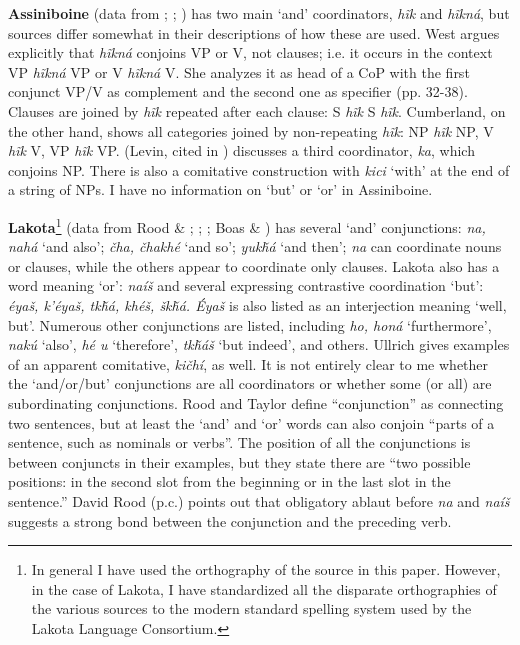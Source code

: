 \documentclass[output=paper]{LSP/langsci}
\begin{document}
\textbf{Assiniboine} (data from \citealt{West2003}; \citealt{Cumberland2005}; \citealt{Levin1964}) has two main `and' coordinators, \textit{h\~ik} and \textit{h\~ikn\'a}, but sources differ somewhat in their descriptions of how these are used. West argues explicitly that \textit{h\~ikn\'a} conjoins VP or V, not clauses; i.e. it occurs in the context VP \textit{h\~ikn\'a} VP or V \textit{h\~ikn\'a} V. She analyzes it as head of a CoP with the first conjunct VP/V as complement and the second one as specifier (pp. 32-38). Clauses are joined by \textit{h\~ik} repeated after each clause: S \textit{h\~ik} S \textit{h\~ik}. Cumberland, on the other hand, shows all categories joined by non-repeating \textit{h\~ik}: NP \textit{h\~ik} NP, V \textit{h\~ik} V, VP \textit{h\~ik} VP. (Levin, cited in \citealt[36]{Stassen2000}) discusses a third coordinator, \textit{ka}, which conjoins NP. There is also a comitative construction with \textit{kici} `with' at the end of a string of NPs. I have no information on `but' or `or' in Assiniboine.

\textbf{Lakota}\footnote{In general I have used the orthography of the source in this paper. However, in the case of Lakota, I have
standardized all the disparate orthographies of the various sources to the modern standard spelling system used by the Lakota Language Consortium.} (data from Rood \& \citealt{Taylor1996}; \citealt{Ingham2002}; \citealt{Ulrich2016}; Boas \& \citealt{Deloria1941}) has several `and' conjunctions: \textit{na, nah\'a} `and also'; \textit{\v{c}ha, \v{c}hakh\'e} `and so'; \textit{yuk\v{h}\'a} `and then'; \textit{na} can coordinate nouns or clauses, while the others appear to coordinate only clauses. Lakota also has a word meaning `or': \textit{na\'i\v{s}} and several expressing contrastive coordination `but': \textit{\'eya\v{s}, k'\'eya\v{s}, tk\v{h}\'a, kh\'e\v{s}, \v{s}k\v{h}\'a. \'Eya\v{s}} is also listed as an interjection meaning `well, but'. Numerous other conjunctions are listed, including \textit{ho, hon\'a} `furthermore', \textit{nak\'u} `also', \textit{h\'e u} `therefore', \textit{tk\v{h}\'a\v{s}} `but indeed', and others. Ullrich gives examples of an apparent comitative, \textit{ki\v{c}h\'i}, as well. It is not entirely clear to me whether the `and/or/but' conjunctions are all coordinators or whether some (or all) are subordinating conjunctions. Rood and Taylor define ``conjunction'' as connecting two sentences, but at least the `and' and `or' words can also conjoin ``parts of a sentence, such as nominals or verbs''. The position of all the conjunctions is between conjuncts in their examples, but they state there are ``two possible positions: in the second slot from the beginning or in the last slot in the sentence.'' David Rood (p.c.) points out that obligatory ablaut before \textit{na} and \textit{na\'i\v{s}} suggests a strong bond between the conjunction and the preceding verb.
\end{document}
